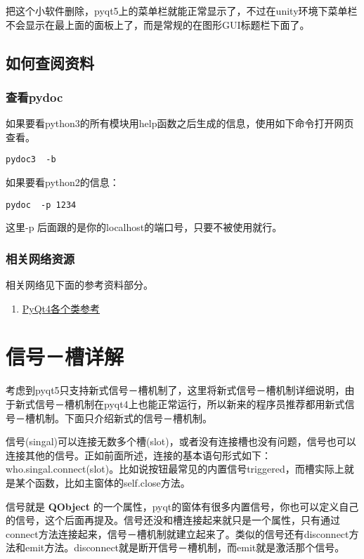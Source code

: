 \documentclass[11pt,oneside]{article}
\begin{document}
把这个小软件删除，pyqt5上的菜单栏就能正常显示了，不过在unity环境下菜单栏不会显示在最上面的面板上了，而是常规的在图形GUI标题栏下面了。





\subsection{如何查阅资料}
\label{sec:orgheadline16}
\subsubsection{查看pydoc}
\label{sec:orgheadline14}
如果要看python3的所有模块用help函数之后生成的信息，使用如下命令打开网页查看。

\begin{Verbatim}
pydoc3  -b
\end{Verbatim}


如果要看python2的信息：
\begin{Verbatim}
pydoc  -p 1234
\end{Verbatim}

这里-p 后面跟的是你的localhost的端口号，只要不被使用就行。


\subsubsection{相关网络资源}
\label{sec:orgheadline15}
相关网络见下面的参考资料部分。

\begin{enumerate}
\item \href{http://pyqt.sourceforge.net/Docs/PyQt4/classes.html}{PyQt4各个类参考}
\end{enumerate}

\section{信号－槽详解}
\label{sec:orgheadline22}
考虑到pyqt5只支持新式信号－槽机制了，这里将新式信号－槽机制详细说明，由于新式信号－槽机制在pyqt4上也能正常运行，所以新来的程序员推荐都用新式信号－槽机制。下面只介绍新式的信号－槽机制。

信号(singal)可以连接无数多个槽(slot)，或者没有连接槽也没有问题，信号也可以连接其他的信号。正如前面所述，连接的基本语句形式如下：who.singal.connect(slot)。比如说按钮最常见的内置信号triggered，而槽实际上就是某个函数，比如主窗体的self.close方法。

信号就是 \textbf{QObject} 的一个属性，pyqt的窗体有很多内置信号，你也可以定义自己的信号，这个后面再提及。信号还没和槽连接起来就只是一个属性，只有通过connect方法连接起来，信号－槽机制就建立起来了。类似的信号还有disconnect方法和emit方法。disconnect就是断开信号－槽机制，而emit就是激活那个信号。
\end{document}
